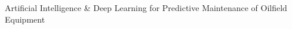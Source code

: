 

\vspace*{\fill}
\begin{center}
	{\Huge Artificial Intelligence \& Deep Learning for Predictive Maintenance of Oilfield Equipment}
\end{center}
\vspace*{\fill}
